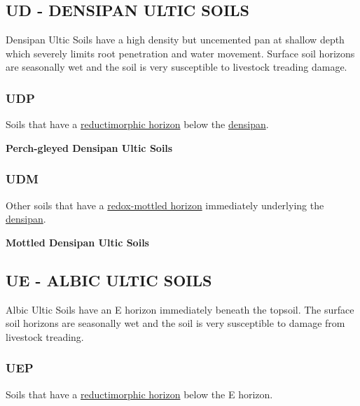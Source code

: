 \documentclass[
  letterpaper,
  DIV=11,
  numbers=noendperiod]{scrreprt}
\begin{document}
\hypertarget{sec-UD}{%
\subsection{\texorpdfstring{\textbf{UD} - DENSIPAN ULTIC
SOILS}{UD - DENSIPAN ULTIC SOILS}}\label{sec-UD}}

Densipan Ultic Soils have a high density but uncemented pan at shallow
depth which severely limits root penetration and water movement. Surface
soil horizons are seasonally wet and the soil is very susceptible to
livestock treading damage.

\hypertarget{sec-key-UDP}{%
\subsubsection{\texorpdfstring{\textbf{UDP}}{UDP}}\label{sec-key-UDP}}

Soils that have a \protect\hyperlink{sec-diag-redmh}{reductimorphic
horizon} below the \protect\hyperlink{sec-diag-dens}{densipan}.

\textbf{Perch-gleyed Densipan Ultic Soils}

\hypertarget{sec-key-UDM}{%
\subsubsection{\texorpdfstring{\textbf{UDM}}{UDM}}\label{sec-key-UDM}}

Other soils that have a \protect\hyperlink{sec-diag-redmh}{redox-mottled
horizon} immediately underlying the
\protect\hyperlink{sec-diag-dens}{densipan}.

\textbf{Mottled Densipan Ultic Soils}

\hypertarget{sec-UE}{%
\subsection{\texorpdfstring{\textbf{UE} - ALBIC ULTIC
SOILS}{UE - ALBIC ULTIC SOILS}}\label{sec-UE}}

Albic Ultic Soils have an E horizon immediately beneath the topsoil. The
surface soil horizons are seasonally wet and the soil is very
susceptible to damage from livestock treading.

\hypertarget{sec-key-UEP}{%
\subsubsection{\texorpdfstring{\textbf{UEP}}{UEP}}\label{sec-key-UEP}}

Soils that have a \protect\hyperlink{sec-diag-redmh}{reductimorphic
horizon} below the E horizon.
\end{document}

